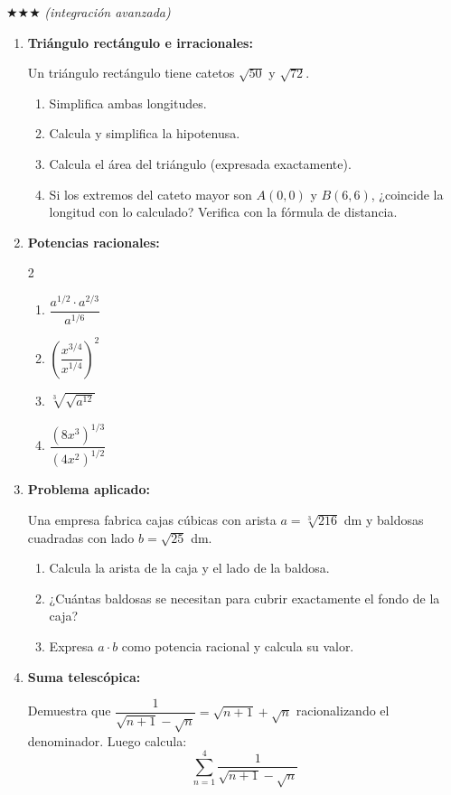 \documentclass[11pt, letterpaper]{article}
\begin{document}
$\bigstar\bigstar\bigstar$ \textit{(integración avanzada)}

\begin{enumerate}[label=\textbf{\arabic*.}, leftmargin=*, resume]

  \item \textbf{Triángulo rectángulo e irracionales:}

  Un triángulo rectángulo tiene catetos $\sqrt{50}$ y $\sqrt{72}$.
  \begin{enumerate}[label=\alph*)]
    \item Simplifica ambas longitudes.
    \item Calcula y simplifica la hipotenusa.
    \item Calcula el área del triángulo (expresada exactamente).
    \item Si los extremos del cateto mayor son $A(0,0)$ y $B(6,6)$, ¿coincide la longitud con lo calculado? Verifica con la fórmula de distancia.
  \end{enumerate}

  \item \textbf{Potencias racionales:}
  \begin{multicols}{2}
  \begin{enumerate}[label=\alph*)]
    \item $\dfrac{a^{1/2}\cdot a^{2/3}}{a^{1/6}}$
    \item $\left(\dfrac{x^{3/4}}{x^{1/4}}\right)^2$
    \item $\sqrt[3]{\sqrt{a^{12}}}$
    \item $\dfrac{(8x^3)^{1/3}}{(4x^2)^{1/2}}$
  \end{enumerate}
  \end{multicols}

  \item \textbf{Problema aplicado:}

  Una empresa fabrica cajas cúbicas con arista $a=\sqrt[3]{216}$ dm y baldosas cuadradas con lado $b=\sqrt{25}$ dm.
  \begin{enumerate}[label=\alph*)]
    \item Calcula la arista de la caja y el lado de la baldosa.
    \item ¿Cuántas baldosas se necesitan para cubrir exactamente el fondo de la caja?
    \item Expresa $a\cdot b$ como potencia racional y calcula su valor.
  \end{enumerate}

  \item \textbf{Suma telescópica:}

  Demuestra que $\dfrac{1}{\sqrt{n+1}-\sqrt{n}}=\sqrt{n+1}+\sqrt{n}$ racionalizando el denominador. Luego calcula:
  $$\sum_{n=1}^{4}\frac{1}{\sqrt{n+1}-\sqrt{n}}$$

\end{enumerate}
\end{document}
